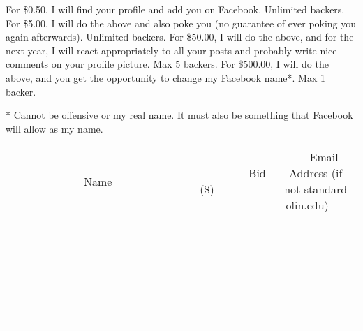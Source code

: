 \documentclass[11pt]{article}
\begin{document}
For \$0.50, I will find your profile and add you on Facebook. Unlimited backers.
For \$5.00, I will do the above and also poke you (no guarantee of ever poking you again afterwards). Unlimited backers.
For \$50.00, I will do the above, and for the next year, I will react appropriately to all your posts and probably write nice comments on your profile picture. Max 5 backers.
For \$500.00, I will do the above, and you get the opportunity to change my Facebook name*. Max 1 backer.

* Cannot be offensive or my real name. It must also be something that Facebook will allow as my name. \\[6ex]
\begin{tabular}{c c c}
~~~~~~~~~~~~~Name~~~~~~~~~~~~~ & ~~~~~~~~~Bid (\$)~~~~~~~~~ & ~~~Email Address (if not standard olin.edu)~~~ \\
 & & \\
\hline
 & & \\
\hline
 & & \\
\hline
 & & \\
\hline
 & & \\
\hline
 & & \\
\hline
 & & \\
\hline
 & & \\
\hline
 & & \\
\hline
 & & \\
\hline
 & & \\
\hline
 & & \\
\hline
 & & \\
\hline
 & & \\
\hline
 & & \\
\hline
 & & \\
\hline
 & & \\
\hline
 & & \\
\hline
 & & \\
\hline
 & & \\
\hline
 & & \\
\hline
 & & \\
\hline
 & & \\
\hline
 & & \\
\hline
 & & \\
\hline
 & & \\
\hline
\end{tabular}
\clearpage
\end{document}

